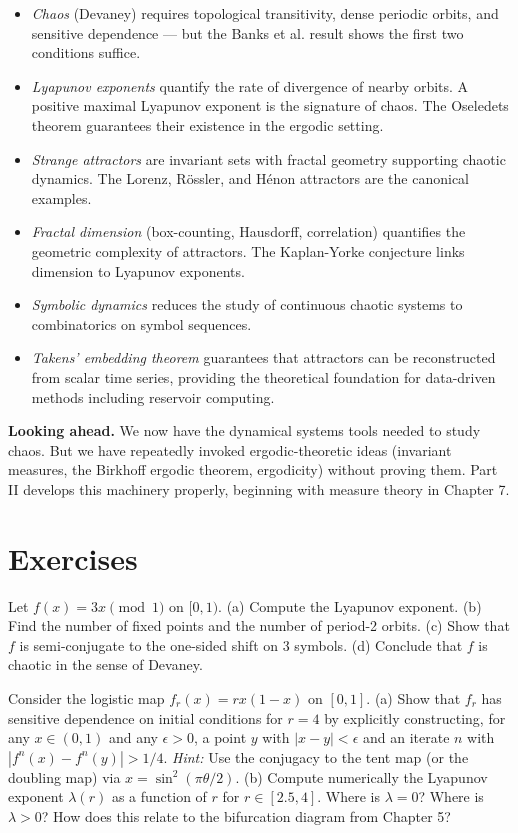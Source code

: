 \begin{itemize}[nosep]
  \item \textit{Chaos} (Devaney) requires topological transitivity, dense periodic orbits, and sensitive dependence --- but the Banks et al. result shows the first two conditions suffice.
  \item \textit{Lyapunov exponents} quantify the rate of divergence of nearby orbits. A positive maximal Lyapunov exponent is the signature of chaos. The Oseledets theorem guarantees their existence in the ergodic setting.
  \item \textit{Strange attractors} are invariant sets with fractal geometry supporting chaotic dynamics. The Lorenz, Rössler, and Hénon attractors are the canonical examples.
  \item \textit{Fractal dimension} (box-counting, Hausdorff, correlation) quantifies the geometric complexity of attractors. The Kaplan-Yorke conjecture links dimension to Lyapunov exponents.
  \item \textit{Symbolic dynamics} reduces the study of continuous chaotic systems to combinatorics on symbol sequences.
  \item \textit{Takens' embedding theorem} guarantees that attractors can be reconstructed from scalar time series, providing the theoretical foundation for data-driven methods including reservoir computing.
\end{itemize}

\textbf{Looking ahead.} We now have the dynamical systems tools needed to study chaos. But we have repeatedly invoked ergodic-theoretic ideas (invariant measures, the Birkhoff ergodic theorem, ergodicity) without proving them. Part II develops this machinery properly, beginning with measure theory in Chapter 7.


\bigskip


\section*{Exercises}

\begin{exercise}
Let $f(x) = 3x \pmod{1}$ on $[0,1)$.
(a) Compute the Lyapunov exponent.
(b) Find the number of fixed points and the number of period-2 orbits.
(c) Show that $f$ is semi-conjugate to the one-sided shift on 3 symbols.
(d) Conclude that $f$ is chaotic in the sense of Devaney.
\end{exercise}


\begin{exercise}
Consider the logistic map $f_r(x) = rx(1-x)$ on $[0,1]$.
(a) Show that $f_r$ has sensitive dependence on initial conditions for $r = 4$ by explicitly constructing, for any $x \in (0,1)$ and any $\epsilon > 0$, a point $y$ with $|x - y| < \epsilon$ and an iterate $n$ with $|f^n(x) - f^n(y)| > 1/4$.
\textit{Hint:} Use the conjugacy to the tent map (or the doubling map) via $x = \sin^2(\pi\theta/2)$.
(b) Compute numerically the Lyapunov exponent $\lambda(r)$ as a function of $r$ for $r \in [2.5, 4]$. Where is $\lambda = 0$? Where is $\lambda > 0$? How does this relate to the bifurcation diagram from Chapter 5?
\end{exercise}


